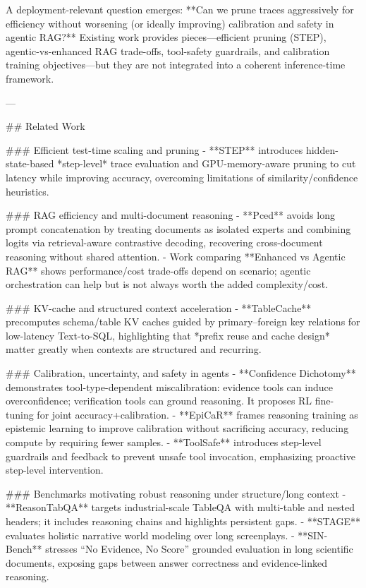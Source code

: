 A deployment-relevant question emerges: **Can we prune traces aggressively for efficiency without worsening (or ideally improving) calibration and safety in agentic RAG?** Existing work provides pieces—efficient pruning (STEP), agentic-vs-enhanced RAG trade-offs, tool-safety guardrails, and calibration training objectives—but they are not integrated into a coherent inference-time framework.

---

## Related Work  

### Efficient test-time scaling and pruning  
- **STEP** introduces hidden-state-based *step-level* trace evaluation and GPU-memory-aware pruning to cut latency while improving accuracy, overcoming limitations of similarity/confidence heuristics.

### RAG efficiency and multi-document reasoning  
- **Pced** avoids long prompt concatenation by treating documents as isolated experts and combining logits via retrieval-aware contrastive decoding, recovering cross-document reasoning without shared attention.  
- Work comparing **Enhanced vs Agentic RAG** shows performance/cost trade-offs depend on scenario; agentic orchestration can help but is not always worth the added complexity/cost.

### KV-cache and structured context acceleration  
- **TableCache** precomputes schema/table KV caches guided by primary–foreign key relations for low-latency Text-to-SQL, highlighting that *prefix reuse and cache design* matter greatly when contexts are structured and recurring.

### Calibration, uncertainty, and safety in agents  
- **Confidence Dichotomy** demonstrates tool-type-dependent miscalibration: evidence tools can induce overconfidence; verification tools can ground reasoning. It proposes RL fine-tuning for joint accuracy+calibration.  
- **EpiCaR** frames reasoning training as epistemic learning to improve calibration without sacrificing accuracy, reducing compute by requiring fewer samples.  
- **ToolSafe** introduces step-level guardrails and feedback to prevent unsafe tool invocation, emphasizing proactive step-level intervention.

### Benchmarks motivating robust reasoning under structure/long context  
- **ReasonTabQA** targets industrial-scale TableQA with multi-table and nested headers; it includes reasoning chains and highlights persistent gaps.  
- **STAGE** evaluates holistic narrative world modeling over long screenplays.  
- **SIN-Bench** stresses “No Evidence, No Score” grounded evaluation in long scientific documents, exposing gaps between answer correctness and evidence-linked reasoning.


